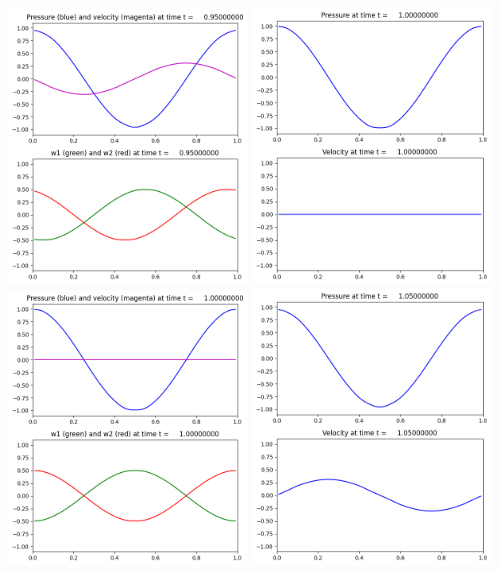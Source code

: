 \documentclass[11pt]{article}
\begin{document}
\includegraphics[width=0.475\textwidth]{frame0019fig2.png}
\vskip 10pt 
\includegraphics[width=0.475\textwidth]{frame0020fig1.png}
\includegraphics[width=0.475\textwidth]{frame0020fig2.png}
\vskip 10pt 
\includegraphics[width=0.475\textwidth]{frame0021fig1.png}
\end{document}
